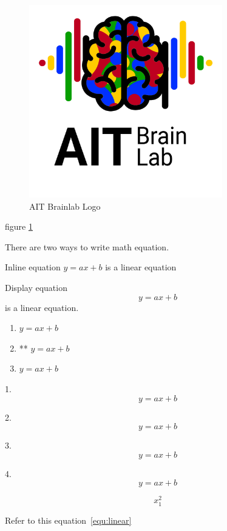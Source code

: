 \documentclass{article}
\begin{document}
\begin{figure}
    \centering
    \caption{\label{fig:thename}AIT Brainlab Logo}
    \includegraphics[width=0.75\textwidth]{figures/bci-logo.png}
\end{figure}

figure \ref{fig:thename}

\newpage

There are two ways to write math equation.

Inline equation $y = ax + b$ is a linear equation

Display equation $$ y = ax + b $$ is a linear equation.

\begin{enumerate}
    \item $y = ax + b$
    \item ** \( y = ax + b \)
    \item \begin{math}
        y = ax + b
    \end{math}
\end{enumerate}

1. 
$$ y = ax + b $$

2.
\[ y = ax + b \]

3. 
\begin{displaymath}
    y = ax + b
\end{displaymath}

4. 
\begin{equation}
    y = ax + b
    \label{equ:linear}
\end{equation}

$$ 
 x^{2}_{1}
$$

Refer to this equation~\ref{equ:linear}

\newpage
\end{document}
